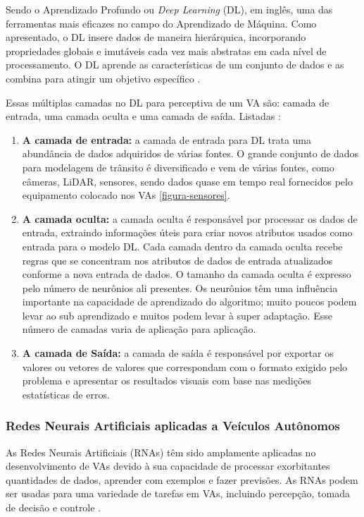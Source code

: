 Sendo o Aprendizado Profundo ou \textit{Deep Learning} (DL), em inglês, uma das ferramentas mais eficazes no campo do Aprendizado de Máquina. Como apresentado, o DL insere dados de maneira hierárquica, incorporando propriedades globais e imutáveis cada vez mais abstratas em cada nível de processamento. O DL aprende as características de um conjunto de dados e as combina para atingir um objetivo específico \cite{software-cnn}.

Essas múltiplas camadas no DL para perceptiva de um VA são: camada de entrada, uma camada oculta e uma camada de saída. Listadas \cite{software-ia}:

\begin{enumerate}
\item \textbf{A camada de entrada:} a camada de entrada para DL trata uma abundância de dados adquiridos de várias fontes. O grande conjunto de dados para modelagem de trânsito é diversificado e vem de várias fontes, como câmeras, LiDAR, sensores, sendo dados quase em tempo real fornecidos pelo equipamento colocado nos VAs \ref{figura-sensores}.
\item \textbf{A camada oculta:} a camada oculta é responsável por processar os dados de entrada, extraindo informações úteis para criar novos atributos usados como entrada para o modelo DL. Cada camada dentro da camada oculta recebe regras que se concentram nos atributos de dados de entrada atualizados conforme a nova entrada de dados. O tamanho da camada oculta é expresso pelo número de neurônios ali presentes. Os neurônios têm uma influência importante na capacidade de aprendizado do algoritmo; muito poucos podem levar ao sub aprendizado e muitos podem levar à super adaptação. Esse número de camadas varia de aplicação para aplicação.
\item \textbf{A camada de Saída:} a camada de saída é responsável por exportar os valores ou vetores de valores que correspondam com o formato exigido pelo problema e apresentar os resultados visuais com base nas medições estatísticas de erros.
\end{enumerate}

\subsubsection{Redes Neurais Artificiais aplicadas a Veículos Autônomos}

As Redes Neurais Artificiais (RNAs) têm sido amplamente aplicadas no desenvolvimento de VAs devido à sua capacidade de processar exorbitantes quantidades de dados, aprender com exemplos e fazer previsões. As RNAs podem ser usadas para uma variedade de tarefas em VAs, incluindo percepção, tomada de decisão e controle \cite{sensors-yet}. 

